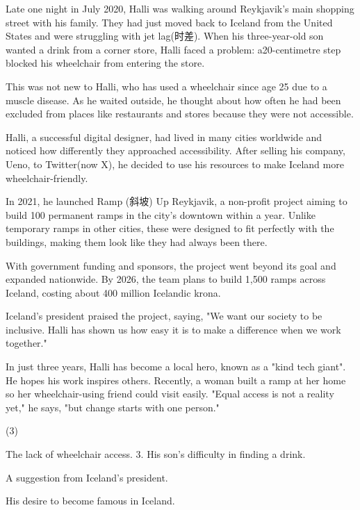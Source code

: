 \documentclass{英语试卷}
\begin{document}
\par Late one night in July 2020, Halli was walking around Reykjavik's main shopping street with his family. They had just moved back to Iceland from the United States and were struggling with jet lag(时差). When his three-year-old son wanted a drink from a corner store, Halli faced a problem: a20-centimetre step blocked his wheelchair from entering the store.\par
\par This was not new to Halli, who has used a wheelchair since age 25 due to a muscle disease. As he waited outside, he thought about how often he had been excluded from places like restaurants and stores because they were not accessible.\par
\par Halli, a successful digital designer, had lived in many cities worldwide and noticed how differently they approached accessibility. After selling his company, Ueno, to Twitter(now X), he decided to use his resources to make Iceland more wheelchair-friendly.\par
\par In 2021, he launched Ramp (斜坡) Up Reykjavik, a non-profit project aiming to build 100 permanent ramps in the city's downtown within a year. Unlike temporary ramps in other cities, these were designed to fit perfectly with the buildings, making them look like they had always been there.\par
\par With government funding and sponsors, the project went beyond its goal and expanded nationwide. By 2026, the team plans to build 1,500 ramps across Iceland, costing about 400 million Icelandic krona.\par
\par Iceland's president praised the project, saying, "We want our society to be inclusive. Halli has shown us how easy it is to make a difference when we work together."\par
\par In just three years, Halli has become a local hero, known as a "kind tech giant". He hopes his work inspires others. Recently, a woman built a ramp at her home so her wheelchair-using friend could visit easily. "Equal access is not a reality yet," he says, "but change starts with one person."\par
{}
\begin{choices}(3)
  \item The lack of wheelchair access. 3. His son's difficulty in finding a drink.
  \item A suggestion from Iceland's president.
  \item His desire to become famous in Iceland.
\end{choices}
\end{document}
